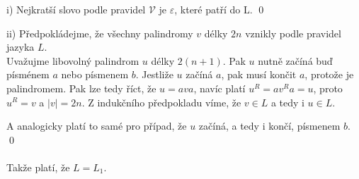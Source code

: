 \documentclass[11pt]{article}
\begin{document}
i) Nejkratší slovo podle pravidel $\mathcal{V}$ je $\varepsilon$, které patří do L. \qed

ii) Předpokládejme, že všechny palindromy $v$ délky $2n$ vznikly podle pravidel jazyka $L$. \\
Uvažujme libovolný palindrom $u$ délky $2(n+1)$. Pak $u$ nutně začíná buď písménem $a$ nebo písmenem $b$. Jestliže $u$ začíná $a$, pak musí končit $a$, protože je palindromem. Pak lze tedy říct, že $u=ava$, navíc platí $u^R = av^Ra = u$, proto $u^R = v$ a $|v|=2n$. Z indukčního předpokladu víme, že $v \in L$ a tedy i $u \in L$.

A analogicky platí to samé pro případ, že $u$ začíná, a tedy i končí, písmenem $b$.
\qed
\\
\\
Takže platí, že $L = L_1$.

 
\end{document}

